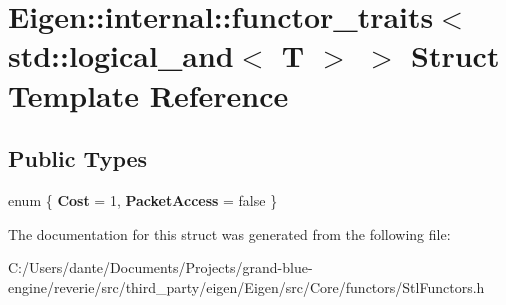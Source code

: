 \hypertarget{struct_eigen_1_1internal_1_1functor__traits_3_01std_1_1logical__and_3_01_t_01_4_01_4}{}\section{Eigen\+::internal\+::functor\+\_\+traits$<$ std\+::logical\+\_\+and$<$ T $>$ $>$ Struct Template Reference}
\label{struct_eigen_1_1internal_1_1functor__traits_3_01std_1_1logical__and_3_01_t_01_4_01_4}
\subsection*{Public Types}
\begin{DoxyCompactItemize}
\item 
\mbox{\label{struct_eigen_1_1internal_1_1functor__traits_3_01std_1_1logical__and_3_01_t_01_4_01_4_a7168b8538d3b394c26934e794f7f845d}} 
enum \{ {\bfseries Cost} = 1, 
{\bfseries Packet\+Access} = false
 \}
\end{DoxyCompactItemize}


The documentation for this struct was generated from the following file\+:\begin{DoxyCompactItemize}
\item 
C\+:/\+Users/dante/\+Documents/\+Projects/grand-\/blue-\/engine/reverie/src/third\+\_\+party/eigen/\+Eigen/src/\+Core/functors/Stl\+Functors.\+h\end{DoxyCompactItemize}
